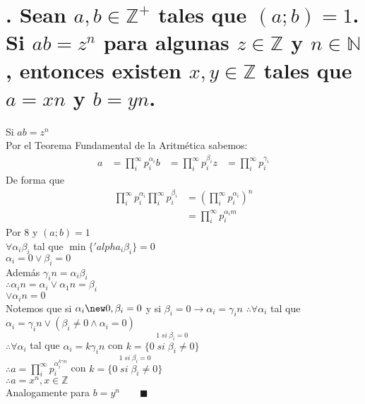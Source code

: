 \section{. Sean $a,b \in \mathbb{Z}^+$ tales que $(a;b) =1$. Si $ab= z^n$ para algunas $z \in \mathbb{Z}$ y $n \in \mathbb{N}$, entonces existen $x,y \in \mathbb{Z}$ tales que $a = xn$ y $b = yn$.}
    Si $ab = z^n$ \\
    Por el Teorema Fundamental de la Aritmética sabemos:
    \begin{align}
        a &= \prod_i^{\infty} p_i^{\alpha_i}
        b &= \prod_i^{\infty} p_i^{\beta_i}
        z &= \prod_i^{\infty} p_i^{\gamma_i}
    \end{align}
    De forma que
    \begin{align}
        \prod_i^{\infty} p_i^{\alpha_i} \prod_i^{\infty} p_i^{\beta_i} &= \left(\prod_i^{\infty} p_i^{\alpha_i}\right)^n \\
        &= \prod_i^{\infty} p_i^{\alpha_im}
    \end{align}
    Por 8 y $(a;b)=1$\\
    $\forall \alpha_i \beta_i$ tal que $\min\{'alpha_i \beta_i\} = 0$ \\
    $\alpha_i = 0 \vee \beta_i = 0$ \\
    Además $\gamma_in = \alpha_i \beta_i$ \\
    $\therefore \alpha_in = \alpha_i \vee \alpha_1n = \beta_i$ \\
    $\vee \alpha_in = 0$ \\
    Notemos que si $\alpha_i \new 0, \beta_i = 0$ y si $\beta_i = 0 \rightarrow \alpha_i = \gamma_in$
    $\therefore \forall \alpha_i$ tal que $\alpha_i = \gamma_in \vee (\beta_i \neq 0 \wedge \alpha_i = 0)$ \\
    $\therefore \forall\alpha_i$ tal que $\alpha_i = k\gamma_in$ con $\displaystyle k = \{ \stackrel{1 \; si \; \beta_i = 0}{0 \; si \; \beta_i \neq 0} \} $ \\
    $\therefore a = \prod_i^{\infty} p_i^{\alpha_i^{k\gamma n}}$ con $\displaystyle k = \{ \stackrel{1 \; si \; \beta_i = 0}{0 \; si \; \beta_i \neq 0} \} $ \\
    $\therefore a = x^n, x \in \mathbb{Z}$ \\
    Analogamente para $b=y^n \qquad \blacksquare$
    